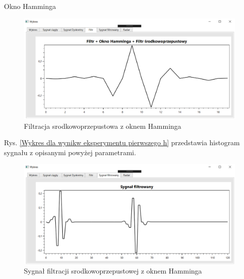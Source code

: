 \documentclass[12pt]{article}
\begin{document}
\newpage
Okno Hamminga
\begin{figure}[h!]
 \centering
 \includegraphics[width=12.3cm]{prostFSOHm.PNG}
 \vspace{-0.3cm}
 \caption{Filtracja srodkowoprzepustowa z oknem Hamminga}
 \label{Wykres dla wyników eksperymentu drugiego}
\end{figure}
\newpage
Rys. \ref{Wykres dla wynikw eksperymentu pierwszego h} przedstawia histogram sygnału z opisanymi powyżej parametrami. 
\begin{figure}[h!]
 \centering
 \includegraphics[width=12.3cm]{prostSFSHm.PNG}
 \vspace{-0.3cm}
 \caption{Sygnał filtracji srodkowoprzepustowej z oknem Hamminga}
 \label{Histogram dla wyników eksperymentu drugiego}
\end{figure}
\end{document}
